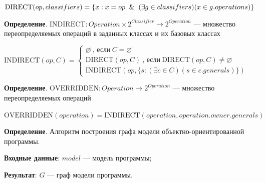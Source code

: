$\textrm{DIRECT}(op, classifiers) = \{ x : x = op \And (\exists g \in classifiers)(x \in g.operations) \}$

\textbf{Определение}. $\textrm{INDIRECT}: Operation \times 2^{Classifier} \to 2^{Operation}$
--- множество переопределяемых операций в заданных классах и их базовых классах

$\textrm{INDIRECT}(op, C) = \begin{cases}
\varnothing \ \textrm{, если} \ C = \varnothing \\
\textrm{DIRECT}(op, C) \ \textrm{, если} \ \textrm{DIRECT}(op, C) \ne \varnothing \\
\textrm{INDIRECT}(op, \{ s : (\exists c \in C)(s \in c.generals) \})
\end{cases}
$

\textbf{Определение}. $\textrm{OVERRIDDEN}: Operation \to 2^{Operation}$
--- множество переопределяемых операций

$\textrm{OVERRIDDEN}(operation) = \textrm{INDIRECT}(operation, operation.owner.generals)$

\textbf{Определение}. Алгоритм построения графа модели объектно-ориентированной программы.

\textbf{Входные данные}: $model$ --- модель программы;

\textbf{Результат}: $G$ --- граф модели программы.

